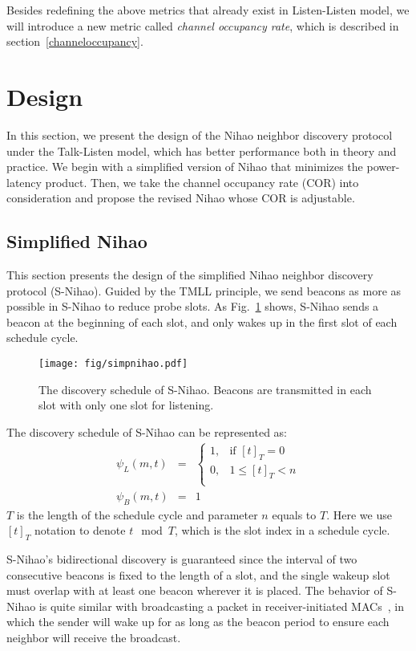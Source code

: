 \documentclass[conference]{IEEEtran}
\begin{document}
Besides redefining the above metrics that already exist in Listen-Listen model,
we will introduce a new metric called \emph{channel occupancy rate}, which is described in section~\ref{channeloccupancy}.

\section{Design}\label{design}
In this section, we present the design of the Nihao neighbor discovery protocol under the Talk-Listen model,
which has better performance both in theory and practice.
We begin with a simplified version of Nihao that minimizes the power-latency product.
Then, we take the channel occupancy rate (COR) into consideration and propose the revised Nihao whose COR is adjustable.

\subsection{Simplified Nihao}
This section presents the design of the simplified Nihao neighbor discovery protocol (S-Nihao).
Guided by the TMLL principle, we send beacons as more as possible in S-Nihao to reduce probe slots.
As Fig.~\ref{simpnihao} shows, S-Nihao sends a beacon at the beginning of each slot, and only wakes up in the first slot of each schedule cycle.

\begin{figure}[t]
    \centering
    \texttt{[image: fig/simpnihao.pdf]}
    \caption{The discovery schedule of S-Nihao. Beacons are transmitted in each slot with only one slot for listening.}\label{simpnihao}
\end{figure}

The discovery schedule of S-Nihao can be represented as:
\begin{eqnarray}
    \psi_L (m,t) & = & \left\{ \begin{array}{ll}
            1, & \textrm{if $[t]_T = 0$} \nonumber \\
            0, & \textrm{$1 \leq [t]_T < n$} \nonumber \\
        \end{array} \right.
\\
    \psi_B (m,t) & = & 1
\end{eqnarray}
$T$ is the length of the schedule cycle and parameter $n$ equals to $T$.
Here we use $[t]_T$ notation to denote $t \mod T$, which is the slot index in a schedule cycle.

S-Nihao's bidirectional discovery is guaranteed since the interval of two consecutive beacons is fixed to the length of a slot,
and the single wakeup slot must overlap with at least one beacon wherever it is placed.
The behavior of S-Nihao is quite similar with broadcasting a packet in receiver-initiated MACs~\cite{sun2008rimac}\cite{dutta2010amac}, 
in which the sender will wake up for as long as the beacon period to ensure each neighbor will receive the broadcast.
\end{document}
